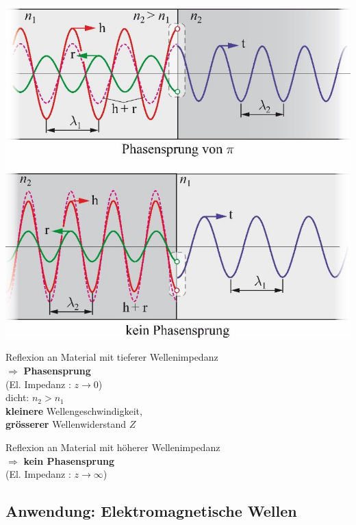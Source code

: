 \begin{minipage}{0.4\linewidth}
	\includegraphics[width=0.9\linewidth]{Bilder/Wellen-Optik/reflexion_phasensprung} \\
\end{minipage}
\hfill
\begin{minipage}{0.58\linewidth}
	Reflexion an Material mit tieferer Wellenimpedanz\\
	$\Rightarrow$ \textbf{Phasensprung} \\
	(El. Impedanz : \(z\rightarrow 0\))\\

	dicht: $n_2 > n_1$ \\
	\textbf{kleinere} Wellengeschwindigkeit,\\
	\textbf{grösserer} Wellenwiderstand $Z$\\
	\vspace{0.2cm}

	Reflexion an Material mit höherer Wellenimpedanz\\
	$\Rightarrow$ \textbf{kein Phasensprung} \\
	(El. Impedanz : \(z\rightarrow \infty \))\\

\end{minipage}


\subsection{Anwendung: Elektromagnetische Wellen}

